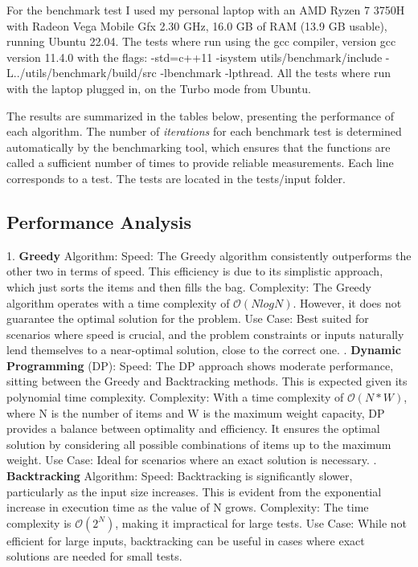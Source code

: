 \documentclass{llncs}
\begin{document}
For the benchmark test I used my personal laptop with an AMD Ryzen 7 3750H with Radeon Vega Mobile
Gfx 2.30 GHz, 16.0 GB of RAM (13.9 GB usable), running Ubuntu 22.04. The tests where run using the
gcc compiler, version gcc version 11.4.0 with the flags: -std=c++11 -isystem utils/benchmark/include 
-L../utils/benchmark/build/src -lbenchmark -lpthread. All the tests where run with the laptop plugged
in, on the Turbo mode from Ubuntu.

The results are summarized in the tables below, presenting the performance of each algorithm. The 
number of \textit{iterations} for each benchmark test is determined automatically by the 
benchmarking tool, which ensures that the functions are called a sufficient number of times to 
provide reliable measurements. Each line corresponds to a test. The tests are located in the tests/input folder.

\subsection{Performance Analysis}
1. \textbf{Greedy} Algorithm:
Speed: The Greedy algorithm consistently outperforms the other two in terms of speed. This
efficiency is due to its simplistic approach, which just sorts the items and then fills the bag.
Complexity: The Greedy algorithm operates with a time complexity of $\mathcal{O}(NlogN)$. However, it does not guarantee the optimal solution for the problem.
Use Case: Best suited for scenarios where speed is crucial, and the problem constraints or inputs 
naturally lend themselves to a near-optimal solution, close to the correct one.
. \textbf{Dynamic Programming} (DP):
Speed: The DP approach shows moderate performance, sitting between the Greedy and Backtracking 
methods. This is expected given its polynomial time complexity.
Complexity: With a time complexity of $\mathcal{O}(N*W)$,  where N is the number of items and 
W is the maximum weight capacity, DP provides a balance between optimality and efficiency. It 
ensures the optimal solution by considering all possible combinations of items up to the maximum
weight.
Use Case: Ideal for scenarios where an exact solution is necessary.
. \textbf{Backtracking} Algorithm:
Speed: Backtracking is significantly slower, particularly as the input size increases. This is
evident from the exponential increase in execution time as the value of N grows.
Complexity: The time complexity is $\mathcal{O}(2^N)$, making it impractical for large tests.
Use Case: While not efficient for large inputs, backtracking can be useful in cases where exact 
solutions are needed for small tests.
\end{document}
